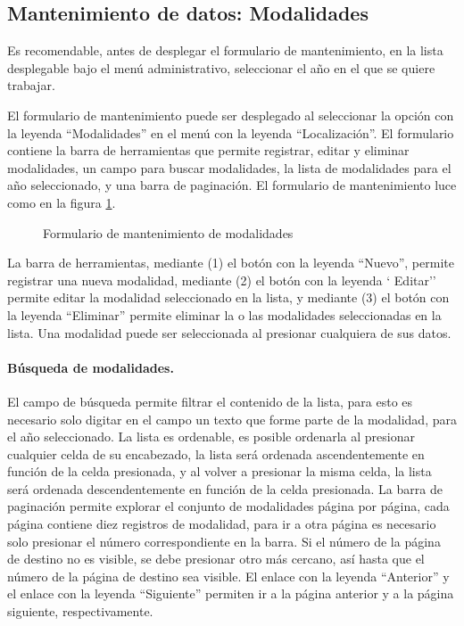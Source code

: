 \documentclass[a4paper, 9pt, conference]{article}              %
\begin{document}
\subsection{Mantenimiento de datos: Modalidades}
Es recomendable, antes de desplegar el formulario de mantenimiento, en la lista desplegable bajo el men\'u administrativo, seleccionar el a\~no en el que se quiere trabajar.

El formulario de mantenimiento puede ser desplegado al seleccionar la opci\'on con la leyenda ``Modalidades'' en el men\'u con la leyenda ``Localizaci\'on''. El formulario contiene la barra de herramientas que permite registrar, editar y eliminar modalidades, un campo para buscar modalidades, la lista de modalidades para el a\~no seleccionado, y una barra de paginaci\'on. El formulario de mantenimiento luce como en la figura \ref{fig:geoenrollmentmodes}.

\begin{figure}
	\centering
		\caption{Formulario de mantenimiento de modalidades}
	\label{fig:geoenrollmentmodes}
\end{figure}

La barra de herramientas, mediante (1) el bot\'on con la leyenda ``Nuevo'', permite registrar una nueva modalidad, mediante (2) el bot\'on con la leyenda ` Editar'' permite editar la modalidad seleccionado en la lista, y mediante (3) el bot\'on con la leyenda ``Eliminar'' permite eliminar la o las modalidades seleccionadas en la lista. Una modalidad puede ser seleccionada al presionar cualquiera de sus datos.

\paragraph{B\'usqueda de modalidades.}

El campo de b\'usqueda permite filtrar el contenido de la lista, para esto es necesario solo digitar en el campo un texto que forme parte de la modalidad, para el a\~no seleccionado. La lista es ordenable, es posible ordenarla al presionar cualquier celda de su encabezado, la lista ser\'a ordenada ascendentemente en funci\'on de la celda presionada, y al volver a presionar la misma celda, la lista ser\'a ordenada descendentemente en funci\'on de la celda presionada. La barra de paginaci\'on permite explorar el conjunto de modalidades p\'agina por p\'agina, cada p\'agina contiene diez registros de modalidad, para ir a otra p\'agina es necesario solo presionar el n\'umero correspondiente en la barra. Si el n\'umero de la p\'agina de destino no es visible, se debe presionar otro m\'as cercano, as\'i hasta que el n\'umero de la p\'agina de destino sea visible. El enlace con la leyenda ``Anterior'' y el enlace con la leyenda ``Siguiente'' permiten ir a la p\'agina anterior y a la p\'agina siguiente, respectivamente.
\end{document}
